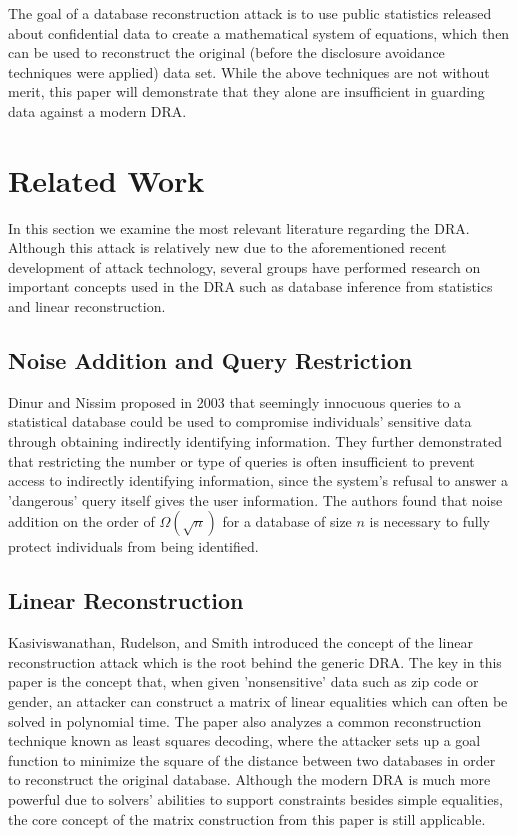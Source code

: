 \documentclass[5p,times,11pt]{elsarticle}
\begin{document}
The goal of a database reconstruction attack is to
use public statistics released about confidential data to create a mathematical system of equations,
which then can be used to reconstruct the original (before the disclosure
avoidance techniques were applied) data set.
While the above techniques are not without merit, this paper will
demonstrate that they alone are insufficient in guarding data against
a modern DRA.

\section{Related Work}


In this section we examine the most relevant literature regarding the DRA. Although this attack is relatively new due to the aforementioned recent development of attack technology, several groups have performed research on important concepts used in the DRA such as database inference from statistics and linear reconstruction.

\subsection{Noise Addition and Query Restriction}
Dinur and Nissim \cite{noise} proposed in 2003 that seemingly innocuous queries to a statistical database could be used to compromise individuals' sensitive data through obtaining indirectly identifying information. They further demonstrated that restricting the number or type of queries is often insufficient to prevent access to indirectly identifying information, since the system's refusal to answer a 'dangerous' query itself gives the user information. The authors found that noise addition on the order of $\Omega(\sqrt{n})$ for a database of size $n$ is necessary to fully protect individuals from being identified.


\subsection{Linear Reconstruction}

Kasiviswanathan, Rudelson, and Smith \cite{linearattack} introduced the concept of the linear reconstruction attack which is the root behind the generic DRA. The key in this paper is the concept that, when given 'nonsensitive' data such as zip code or gender, an attacker can construct a matrix of linear equalities which can often be solved in polynomial time. The paper also analyzes a common reconstruction technique known as least squares decoding, where the attacker sets up a goal function to minimize the square of the distance between two databases in order to reconstruct the original database. Although the modern DRA is much more powerful due to solvers' abilities to support constraints besides simple equalities, the core concept of the matrix construction from this paper is still applicable.
\end{document}
